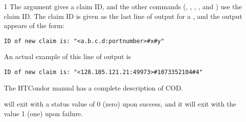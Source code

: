 \begin{ManPage}{\label{man-condor-cod}}{1}
The  argument gives a claim ID, and the other 
commands (, , , ,
and ) use the claim ID.
The claim ID is given as the last line of output for a ,
and the output appears of the form:
\footnotesize
\begin{verbatim}
ID of new claim is: "<a.b.c.d:portnumber>#x#y"
\end{verbatim}
\normalsize
An actual example of this line of output is 
\footnotesize
\begin{verbatim}
ID of new claim is: "<128.105.121.21:49973>#1073352104#4"
\end{verbatim}
\normalsize

The HTCondor manual has a complete description of COD.

\begin{Options}
  \ToolArgsBaseDesc
  \ToolLocateDesc
\end{Options}

\GenRem

\Examples

\ExitStatus

 will exit with a status value of 0 (zero) upon success,
and it will exit with the value 1 (one) upon failure.

\end{ManPage}
